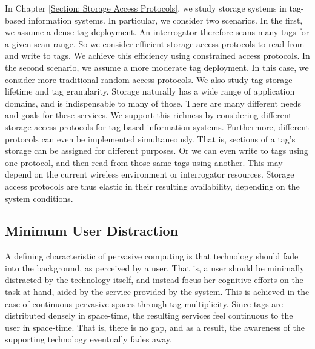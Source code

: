 In Chapter \ref{Section: Storage Access Protocols}, we study storage systems in tag-based information systems. In particular, we consider two scenarios. In the first, we assume a dense tag deployment. An interrogator therefore scans many tags for a given scan range. So we consider efficient storage access protocols to read from and write to tags. We achieve this efficiency using constrained access protocols. In the second scenario, we assume a more moderate tag deployment. In this case, we consider more traditional random access protocols. We also study tag storage lifetime and tag granularity. Storage naturally has a wide range of application domains, and is indispensable to many of those. There are many different needs and goals for these services. We support this richness by considering different storage access protocols for tag-based information systems. Furthermore, different protocols can even be implemented simultaneously. That is, sections of a tag's storage can be assigned for different purposes. Or we can even write to tags using one protocol, and then read from those same tags using another. This may depend on the current wireless environment or interrogator resources. Storage access protocols are thus elastic in their resulting availability, depending on the system conditions.

\subsection{Minimum User Distraction}
A defining characteristic of pervasive computing is that technology should fade into the background, as perceived by a user. That is, a user should be minimally distracted by the technology itself, and instead focus her cognitive efforts on the task at hand, aided by the service provided by the system. This is achieved in the case of continuous pervasive spaces through tag multiplicity. Since tags are distributed densely in space-time, the resulting services feel continuous to the user in space-time. That is, there is no gap, and as a result, the awareness of the supporting technology eventually fades away.

